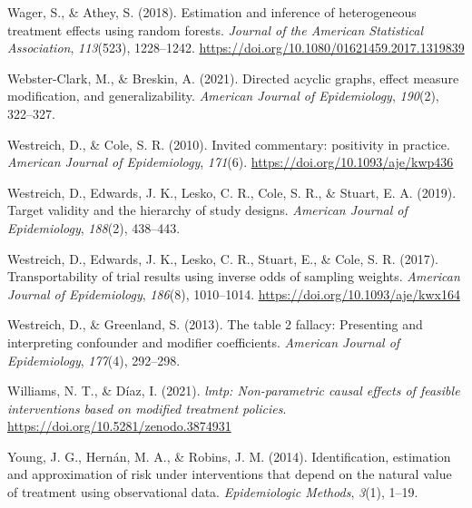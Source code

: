 \documentclass[
  single column]{article}
\newlength{\cslhangindent}
\newenvironment{CSLReferences}[2] %
 {\begin{list}{}{%
  \setlength{\itemindent}{0pt}
  \setlength{\leftmargin}{0pt}
  \setlength{\parsep}{0pt}
  \ifodd #1
   \setlength{\leftmargin}{\cslhangindent}
   \setlength{\itemindent}{-1\cslhangindent}
  \fi
  \setlength{\itemsep}{#2\baselineskip}}}
 {\end{list}}
\begin{document}
\begin{CSLReferences}{1}{0}
Wager, S., \& Athey, S. (2018). Estimation and inference of
heterogeneous treatment effects using random forests. \emph{Journal of
the American Statistical Association}, \emph{113}(523), 1228--1242.
\url{https://doi.org/10.1080/01621459.2017.1319839}

Webster-Clark, M., \& Breskin, A. (2021). Directed acyclic graphs,
effect measure modification, and generalizability. \emph{American
Journal of Epidemiology}, \emph{190}(2), 322--327.

Westreich, D., \& Cole, S. R. (2010). Invited commentary: positivity in
practice. \emph{American Journal of Epidemiology}, \emph{171}(6).
\url{https://doi.org/10.1093/aje/kwp436}

Westreich, D., Edwards, J. K., Lesko, C. R., Cole, S. R., \& Stuart, E.
A. (2019). Target validity and the hierarchy of study designs.
\emph{American Journal of Epidemiology}, \emph{188}(2), 438--443.

Westreich, D., Edwards, J. K., Lesko, C. R., Stuart, E., \& Cole, S. R.
(2017). Transportability of trial results using inverse odds of sampling
weights. \emph{American Journal of Epidemiology}, \emph{186}(8),
1010--1014. \url{https://doi.org/10.1093/aje/kwx164}

Westreich, D., \& Greenland, S. (2013). The table 2 fallacy: Presenting
and interpreting confounder and modifier coefficients. \emph{American
Journal of Epidemiology}, \emph{177}(4), 292--298.

Williams, N. T., \& Díaz, I. (2021). \emph{{l}mtp: Non-parametric causal
effects of feasible interventions based on modified treatment policies}.
\url{https://doi.org/10.5281/zenodo.3874931}

Young, J. G., Hernán, M. A., \& Robins, J. M. (2014). Identification,
estimation and approximation of risk under interventions that depend on
the natural value of treatment using observational data.
\emph{Epidemiologic Methods}, \emph{3}(1), 1--19.

\end{CSLReferences}
\end{document}
